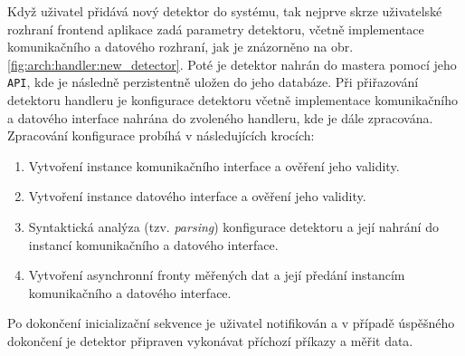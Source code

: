Když uživatel přidává nový detektor do systému, tak nejprve skrze uživatelské rozhraní frontend aplikace zadá parametry detektoru, včetně implementace komunikačního a datového rozhraní, jak je znázorněno na obr. \ref{fig:arch:handler:new_detector}. Poté je detektor nahrán do mastera pomocí jeho \texttt{API}, kde je následně perzistentně uložen do jeho databáze. Při přiřazování detektoru handleru je konfigurace detektoru včetně implementace komunikačního a datového interface nahrána do zvoleného handleru, kde je dále zpracována. Zpracování konfigurace probíhá v následujících krocích:
\begin{enumerate}
    \item Vytvoření instance komunikačního interface a ověření jeho validity.
    \item Vytvoření instance datového interface a ověření jeho validity.
    \item Syntaktická analýza (tzv. \textit{parsing}) konfigurace detektoru a její nahrání do instancí komunikačního a datového interface.
    \item Vytvoření asynchronní fronty měřených dat a její předání instancím komunikačního a datového interface.
\end{enumerate}
Po dokončení inicializační sekvence je uživatel notifikován a v případě úspěšného dokončení je detektor připraven vykonávat příchozí příkazy a měřit data.

